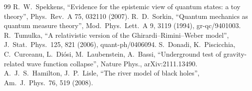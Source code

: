 \documentclass[11pt,a4paper]{article}
\begin{document}
\begin{thebibliography}{99}
 R.~W.~Spekkens, ``Evidence for the epistemic view of quantum states: a toy theory'', Phys.\ Rev.\ A 75, 032110 (2007).
 R.~D.~Sorkin, ``Quantum mechanics as quantum measure theory'', Mod.\ Phys.\ Lett.\ A 9, 3119 (1994), gr-qc/9401003.
 R.~Tumulka, ``A relativistic version of the Ghirardi--Rimini--Weber model'', J.\ Stat.\ Phys.\ 125, 821 (2006), quant-ph/0406094.
 S.~Donadi, K.~Piscicchia, C.~Curceanu, L.~Di\'osi, M.~Laubenstein, A.~Bassi, ``Underground test of gravity-related wave function collapse'', Nature Phys., arXiv:2111.13490.
 A.~J.~S.~Hamilton, J.~P.~Lisle, ``The river model of black holes'', Am.\ J.\ Phys.\ 76, 519 (2008).
\end{thebibliography}
\end{document}
